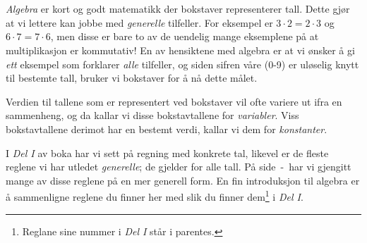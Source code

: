 


\section{\algintro}
\textit{Algebra} er kort og godt matematikk der bokstaver representerer tall. Dette gjør at vi lettere kan jobbe med \textsl{generelle} tilfeller. For eksempel er $ {3\cdot 2=2\cdot3} $ og $ 6\cdot7=7\cdot6 $, men disse er bare to av de uendelig mange eksemplene på at multiplikasjon er kommutativ! En av hensiktene med algebra er at vi ønsker å gi \textsl{ett} eksempel som forklarer \textsl{alle} tilfeller, og siden sifren våre (0-9) er uløselig knytt til bestemte tall, bruker vi bokstaver for å nå dette målet. \vsk

Verdien til tallene som er representert ved bokstaver vil ofte variere ut ifra en sammenheng, og da kallar vi disse bokstavtallene for \textit{variabler}. Viss bokstavtallene derimot har en bestemt verdi, kallar vi dem for \textit{konstanter}.

\vsk

I \textsl{Del I} av boka har vi sett på regning med konkrete tal, likevel er de fleste reglene vi har utledet \textsl{generelle}; de gjelder for alle tall. På side \pageref{regstart}\,-\,\pageref{regslutt} har vi gjengitt mange av disse reglene på en mer generell form. En fin introduksjon til algebra er å sammenligne reglene du finner her med slik du finner dem\footnote{Reglane sine nummer i \textsl{Del I} står i parentes.} i \textsl{Del I}. \vsk

\regv
\label{regstart}
\reg[\adkom\;(\ref{adkom}) \label{adkomalg}]{\vs
\[ a+ b =b+a \]
}
\eks{ \vsb
\[ 7+ 5=5+7 \]
} \vsk \vsk

\reg[\gangkom\;(\ref{gangkom})]{\vs
	\[ a\cdot b =b\cdot a \]
}
\eks[1]{ \vsb
	\[ 9\cdot 8=8\cdot9 \]
}
\eks[2]{ \vsb
\[  8\cdot a= a\cdot 8  \]
}
\newpage
{}
\vsk 

\reg[\brdef\;(\ref{brdef})]{
\[ a:b=\frac{a}{b} \]
}
\eks[]{ \vs
\[a:2= \frac{a}{2} \]
}
 \vsk 

